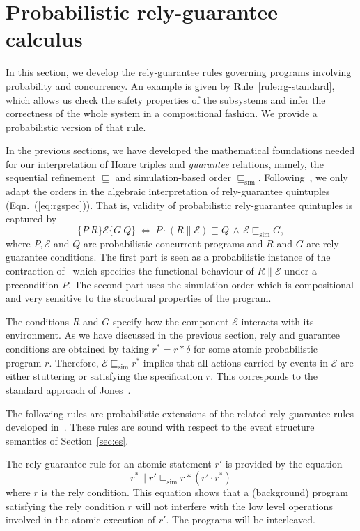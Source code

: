 \documentclass[review]{elsart}
\newcommand{\EE}{\mathcal{E}}
\newcommand{\triple}[3]{\{#1\}#2\{#3\}}
\newcommand{\bks}{*}
\newcommand{\refby}{\sqsubseteq}
\newcommand{\simref}{\refby_{\mathrm{sim}}}
\newcommand{\Eqn}[1]{Eqn.~(\ref{#1})}
\begin{document}
\section{Probabilistic rely-guarantee calculus}\label{sec:prg-rules}

In this section, we develop the rely-guarantee rules governing programs involving probability and concurrency. An example is given by Rule~\ref{rule:rg-standard}, which allows us check the safety properties of the subsystems and infer the correctness of the whole system in a compositional fashion. We provide a probabilistic version of that rule.

In the previous sections, we have developed the mathematical foundations needed for our interpretation of Hoare triples and \emph{guarantee} relations, namely, the sequential refinement $\refby$ and simulation-based order $\simref$. Following~\cite{Hoa09a}, we only adapt the orders in the algebraic interpretation of rely-guarantee quintuples (\Eqn{eq:rgspec}). That is, validity of probabilistic rely-guarantee quintuples is captured by
\[
\triple{P\ R}{\EE}{G\ Q} \ \Leftrightarrow \ 	P{\cdot}(R\|\EE)\refby Q\, \wedge\, \EE\simref G,
\]
where $P,\EE$ and $Q$ are probabilistic concurrent programs and $R$ and $G$ are rely-guarantee conditions. The first part is seen as a probabilistic instance of the contraction of~\cite{Arm14} which specifies the functional behaviour of $R\|\EE$ under a precondition $P$. The second part uses the simulation order which is compositional and  very sensitive to the structural properties of the program.

The conditions $R$ and $G$ specify how the component $\EE$ interacts with its environment. As we have discussed in the previous section, rely and guarantee conditions are obtained by taking $r^{\bks} = r{\bks}\delta$ for some atomic probabilistic program $r$. Therefore, $\EE\simref r^{\bks}$ implies that all actions carried by events in $\EE$ are either stuttering or satisfying the specification $r$. This corresponds to the standard approach of Jones~\cite{Jon12,Jon81}.

The following rules are probabilistic extensions of the related rely-guarantee rules developed in~\cite{Hoa11,Jon12}. These rules are  sound with respect to the event structure semantics of Section~\ref{sec:es}.

The rely-guarantee rule for an atomic statement $r'$ is provided by the equation
\begin{equation}\label{rule:atomic}
r^{\bks}\|r'\simref r{\bks}(r'{\cdot} r^{\bks})
\end{equation}
where $r$ is the rely condition. This equation shows that a (background) program satisfying the rely condition $r$ will not interfere with the low level operations involved in the atomic execution of $r'$. The programs will be interleaved.
\end{document}
